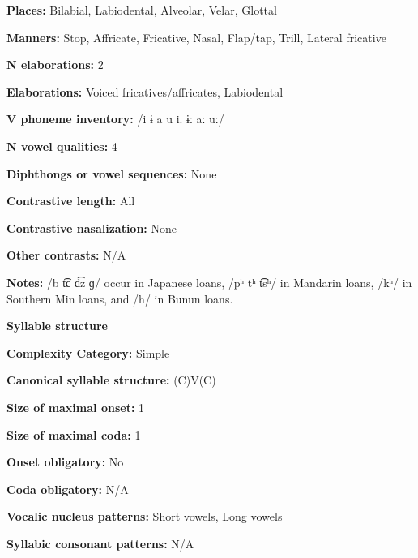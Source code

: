 \textbf{Places:} Bilabial, Labiodental, Alveolar, Velar, Glottal



\textbf{Manners:} Stop, Affricate, Fricative, Nasal, Flap/tap, Trill, Lateral fricative



\textbf{N elaborations:} 2



\textbf{Elaborations:} Voiced fricatives/affricates, Labiodental



\textbf{V phoneme inventory:} /i ɨ a u iː ɨː aː uː/



\textbf{N vowel qualities:} 4



\textbf{Diphthongs or vowel sequences:} None



\textbf{Contrastive length:} All



\textbf{Contrastive nasalization:} None



\textbf{Other contrasts:} N/A



\textbf{Notes:} /b t͡ɕ d͡z ɡ/ occur in Japanese loans, /pʰ tʰ t͡sʰ/ in Mandarin loans, /kʰ/ in Southern Min loans, and /h/ in Bunun loans.



\textbf{Syllable structure}



\textbf{Complexity Category:} Simple



\textbf{Canonical syllable structure:} (C)V(C) \citep[32-33]{Pan2012}



\textbf{Size of maximal onset:} 1



\textbf{Size of maximal coda:} 1



\textbf{Onset obligatory:} No



\textbf{Coda obligatory:} N/A



\textbf{Vocalic nucleus patterns:} Short vowels, Long vowels



\textbf{Syllabic consonant patterns:} N/A



